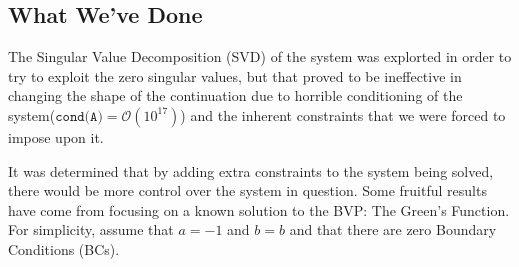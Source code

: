 \documentclass[11pt]{amsart}
\begin{document}
\subsection{What We've Done} 
The Singular Value Decomposition (SVD) of the system was explorted in order to try to exploit the zero singular values, but that proved to be ineffective in changing the shape of the continuation due to horrible conditioning of the system($\texttt{cond(A)}=\mathcal{O}(10^{17})$)  and the inherent constraints that we were forced to impose upon it. 

It was determined that by adding extra constraints to the system being solved, there would be more control over the system in question. Some fruitful results have come from focusing on a known solution to the BVP: The Green's Function. For simplicity, assume that $a=-1$ and $b=b$ and that there are zero Boundary Conditions (BCs). 
\end{document}
